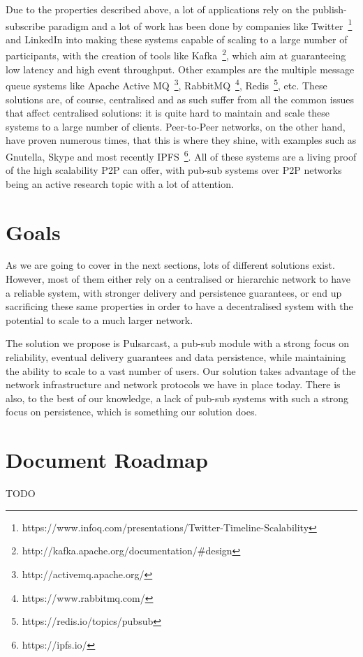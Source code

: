 Due to the properties described above, a lot of applications rely on the
publish-subscribe paradigm and a lot of work has been done by companies like
Twitter~\footnote{https://www.infoq.com/presentations/Twitter-Timeline-Scalability}
and LinkedIn into making these systems capable of scaling to a large number of
participants, with the creation of tools like
Kafka~\footnote{http://kafka.apache.org/documentation/\#design}, which aim at
guaranteeing low latency and high event throughput. Other examples are the
multiple message queue systems like Apache Active
MQ~\footnote{http://activemq.apache.org/},
RabbitMQ~\footnote{https://www.rabbitmq.com/},
Redis~\footnote{https://redis.io/topics/pubsub}, etc.  These solutions are, of
course, centralised and as such suffer from all the common issues that affect
centralised solutions: it is quite hard to maintain and scale these systems to
a large number of clients. Peer-to-Peer networks, on the other hand, have
proven numerous times, that this is where they shine, with examples such as
Gnutella, Skype and most recently IPFS~\footnote{https://ipfs.io/}.  All of
these systems are a living proof of the high scalability P2P can offer, with
pub-sub systems over P2P networks being an active research topic with a lot of
attention.

\section{Goals}

As we are going to cover in the next sections, lots of different
solutions exist. However, most of them either rely on a
centralised or hierarchic network to have a reliable system, with
stronger delivery and persistence guarantees, or end up sacrificing
these same properties in order to have a decentralised system with the
potential to scale to a much larger network.

The solution we propose is Pulsarcast, a pub-sub module with a strong focus on
reliability, eventual delivery guarantees and data persistence, while
maintaining the ability to scale to a vast number of users. Our solution takes
advantage of the network infrastructure and network protocols we have in place
today. There is also, to the best of our knowledge, a lack of pub-sub systems
with such a strong focus on persistence, which is something our solution does.

\section{Document Roadmap}

TODO
